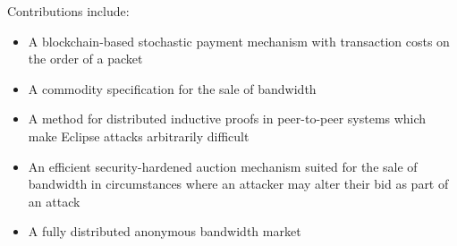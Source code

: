 \begin{comment}
The Internet's current structure is the product of two forces: (1)
what is easy to implement for a small to medium sized company, and
(2) the desires of mankind.

Unfortunately, not all desires of mankind have proved agreeable. For
example, as methods for censoring browsing and discovering private
browsing information have improved, consumers have found themselves
in the unenviable position of needing to decide between their
privacy and usable Internet access. Even for those willing to suffer
the usability hit, current methods to achieve unrestricted,
unsurveilled Internet access such as I2P and Tor suffer from a
tragedy of the commons – only a few thousand unpaid volunteers host
proxies and exit nodes, allowing sophisticated attackers a tractable
number of nodes to monitor or otherwise compromise.

Similarly, not all desirable services have proved easy to
implement. Perverse economic incentives stemming from widely
available free content have resulted in a news media bereft of
subscribers, slowly descending into a minute-to-minute battle for
clicks. The high cost of distributing video has resulted in
centralization, platforms, and burdens on content creators. The
difficulty of maintaining and securing a sever have resulted in less
diversity than one might have hoped for.

To address these issues, we present a high performance approach to
networking built on a foundation of micropayments, and as an initial
application of the technology, build an uncensorable, anonymous
mechanism for accessing the global Internet. It is our hope that as
the tokens gain in acceptance, many millions of websites will
incorporate the payment models described here, and consumers will
receive a monthly budget of tokens from their ISP.
\end{comment}

\smallskip
\noindent
Contributions include:
\begin{itemize}
\item A blockchain-based stochastic payment mechanism with transaction costs on the order of a packet
\item A commodity specification for the sale of bandwidth
\item A method for distributed inductive proofs in peer-to-peer systems which make Eclipse attacks arbitrarily difficult
\item An efficient security-hardened auction mechanism suited for the sale of bandwidth in circumstances where an attacker may alter their bid as part of an attack
\item A fully distributed anonymous bandwidth market
\end{itemize}
